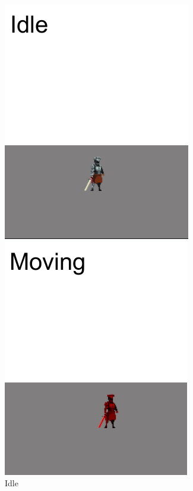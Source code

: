 \documentclass[a4paper,12pt,openright]{book}
\begin{document}
\begin{figure}[!hb]
  \includegraphics[width=\linewidth]{Images/IdleState.png}
  \caption{Idle}\label{StateFig:Idle}
\endminipage\hfill
{}
  \includegraphics[width=\linewidth]{Images/MovingState.png}

\end{figure}
\end{document}
